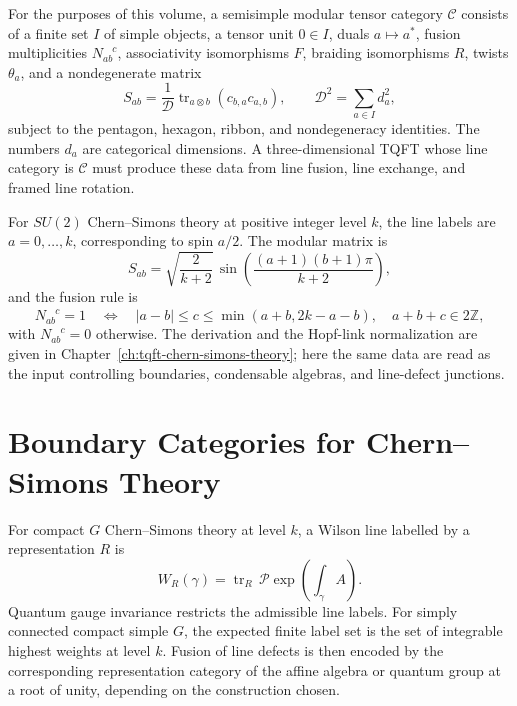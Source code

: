 \begin{definition}
\label{def:modular-tensor-category-data}
For the purposes of this volume, a semisimple modular tensor category
\(\mathcal C\) consists of a finite set \(I\) of simple objects, a tensor unit
\(0\in I\), duals \(a\mapsto a^*\), fusion multiplicities
\(N_{ab}^{\phantom{ab}c}\), associativity isomorphisms \(F\), braiding
isomorphisms \(R\), twists \(\theta_a\), and a nondegenerate matrix
\[
  S_{ab}=\frac{1}{\mathcal D}
  \operatorname{tr}_{a\otimes b}\!\left(c_{b,a}c_{a,b}\right),
  \qquad
  \mathcal D^2=\sum_{a\in I}d_a^2,
\]
subject to the pentagon, hexagon, ribbon, and nondegeneracy identities.  The
numbers \(d_a\) are categorical dimensions.  A three-dimensional TQFT whose
line category is \(\mathcal C\) must produce these data from line fusion,
line exchange, and framed line rotation.
\end{definition}

\begin{example}
\label{ex:su2k-line-data-boundary-chapter}
For \(SU(2)\) Chern--Simons theory at positive integer level \(k\), the line
labels are \(a=0,\ldots,k\), corresponding to spin \(a/2\).  The modular
matrix is
\[
  S_{ab}
  =
  \sqrt{\frac{2}{k+2}}\,
  \sin\!\left(\frac{(a+1)(b+1)\pi}{k+2}\right),
\]
and the fusion rule is
\[
  N_{ab}^{\phantom{ab}c}=1
  \quad\Longleftrightarrow\quad
  |a-b|\le c\le \min(a+b,2k-a-b),
  \quad a+b+c\in2\mathbb Z,
\]
with \(N_{ab}^{\phantom{ab}c}=0\) otherwise.  The derivation and the Hopf-link
normalization are given in
Chapter~\ref{ch:tqft-chern-simons-theory}; here the same data are read as the
input controlling boundaries, condensable algebras, and line-defect junctions.
\end{example}

\section{Boundary Categories for Chern--Simons Theory}

For compact \(G\) Chern--Simons theory at level \(k\), a Wilson line labelled
by a representation \(R\) is
\[
  W_R(\gamma)=\operatorname{tr}_R\,\mathcal P
  \exp\!\left(\int_\gamma A\right).
\]
Quantum gauge invariance restricts the admissible line labels.  For simply
connected compact simple \(G\), the expected finite label set is the set of
integrable highest weights at level \(k\).  Fusion of line defects is then
encoded by the corresponding representation category of the affine algebra or
quantum group at a root of unity, depending on the construction chosen.

